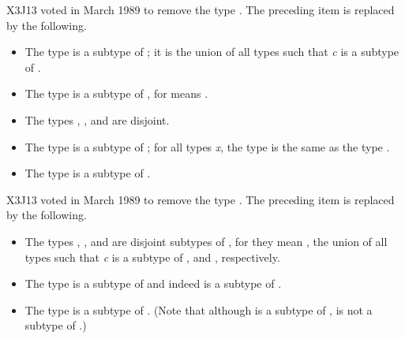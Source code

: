\newpage%
\begin{newer}
X3J13 voted in March 1989  to remove the type .
The preceding item is replaced by the following.
\begin{itemize}
\item
The type  is a subtype of ; it is the union of
all types  such that \emph{c} is a subtype of .
\end{itemize}
\end{newer}

\begin{itemize}
\item
The type  is a subtype of , for 
means .

\item
The types , , and  are disjoint.

\item
The type  is a subtype of ; for all types \emph{x},
the type  is the same as the type .

\item
The type  is a subtype of .
\end{itemize}

\begin{newer}
X3J13 voted in March 1989  to remove the type .
The preceding item is replaced by the following.
\begin{itemize}
\item
The types , , and
 are disjoint subtypes of , for they
mean , the union of all types
 such that \emph{c} is a subtype of ,
and , respectively.
\end{itemize}
\end{newer}

\begin{itemize}
\item
The type  is a subtype of  and indeed
is a subtype of .

\item
The type  is a subtype of .
(Note that although  is a subtype of ,
 is not a subtype of .)
\end{itemize}

